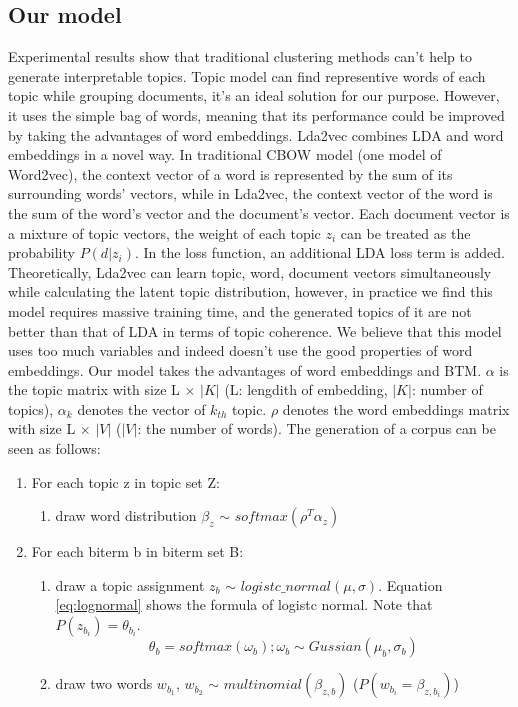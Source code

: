 \subsection{Our model}
\label{sec:modeling}
Experimental results show that traditional clustering methods can't help to generate interpretable topics.
Topic model can find representive words of each topic while grouping documents, it's an ideal solution for our purpose. However, it uses the simple bag of words, meaning that its performance could be improved by taking the advantages of word embeddings. Lda2vec \cite{moody2016mixing} combines LDA and word embeddings in a novel way. In traditional CBOW model (one model of Word2vec), the context vector of a word is represented by the sum of its surrounding words' vectors, while in Lda2vec, the context vector of the word is the sum of the word's vector and the document's vector. Each document vector is a mixture of topic vectors, the weight of each topic $z_i$ can be treated as the probability $P(d|z_i)$. In the loss function, an additional LDA loss term is added. Theoretically, Lda2vec can learn topic, word, document vectors simultaneously while calculating the latent topic distribution, however, in practice we find this model requires massive training time, and the generated topics of it are not better than that of LDA in terms of topic coherence. We believe that this model uses too much variables and indeed doesn't use the good properties of word embeddings. Our model takes the advantages of word embeddings and BTM. $\alpha$ is the topic matrix with size L $\times$ $|K|$ (L: lengdith of embedding, $|K|$: number of topics), $\alpha_k$ denotes the vector of $k_{th}$ topic. $\rho$ denotes the word embeddings matrix with size L $\times$ $|V|$ ($|V|$: the number of words). The generation of a corpus can be seen as follows:
\begin{enumerate}
    \item For each topic z in topic set Z:
    \begin{enumerate}
        \item draw word distribution $\beta_z$ $\sim$ $softmax(\rho^T\alpha_z)$
    \end{enumerate}
    \item For each biterm b in biterm set B:
    \begin{enumerate}
        \item draw a topic assignment $z_b$ $\sim$ $logistc\_normal(\mu, \sigma)$.
        Equation \ref{eq:lognormal} shows the formula of logistc normal. Note that $P(z_{b_i}) = \theta_{b_i}$.
        \begin{equation}
            \theta_b=softmax(\omega_b); \omega_b \sim Gussian(\mu_b, \sigma_b)
            \label{eq:lognormal}
        \end{equation}
        \item draw two words $w_{b_1}$, $w_{b_2}$ $\sim$ $multinomial(\beta_{z,b})$ ($P(w_{b_i} = \beta_{z,{b_i}})$)
    \end{enumerate}
\end{enumerate} 
